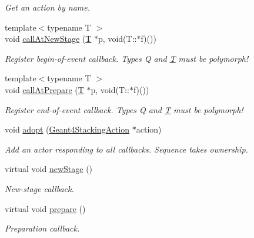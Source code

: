 \begin{DoxyCompactItemize}
\begin{DoxyCompactList}\small\item\em Get an action by name. \item\end{DoxyCompactList}\item 
{\footnotesize template$<$typename T $>$ }\\void \hyperlink{class_d_d4hep_1_1_simulation_1_1_geant4_stacking_action_sequence_a653b407655119e1d390d1297da1100c2}{callAtNewStage} (\hyperlink{class_t}{T} $\ast$p, void(T::$\ast$f)())
\begin{DoxyCompactList}\small\item\em Register begin-\/of-\/event callback. Types Q and \hyperlink{class_t}{T} must be polymorph! \item\end{DoxyCompactList}\item 
{\footnotesize template$<$typename T $>$ }\\void \hyperlink{class_d_d4hep_1_1_simulation_1_1_geant4_stacking_action_sequence_ab8f7094741075bb59ba07ef0c33d1c6c}{callAtPrepare} (\hyperlink{class_t}{T} $\ast$p, void(T::$\ast$f)())
\begin{DoxyCompactList}\small\item\em Register end-\/of-\/event callback. Types Q and \hyperlink{class_t}{T} must be polymorph! \item\end{DoxyCompactList}\item 
void \hyperlink{class_d_d4hep_1_1_simulation_1_1_geant4_stacking_action_sequence_a19b6f7d514d79b40c490226a361d55b4}{adopt} (\hyperlink{class_d_d4hep_1_1_simulation_1_1_geant4_stacking_action}{Geant4StackingAction} $\ast$action)
\begin{DoxyCompactList}\small\item\em Add an actor responding to all callbacks. Sequence takes ownership. \item\end{DoxyCompactList}\item 
virtual void \hyperlink{class_d_d4hep_1_1_simulation_1_1_geant4_stacking_action_sequence_a8077fe558cebbeeef5af0114abab6a55}{newStage} ()
\begin{DoxyCompactList}\small\item\em New-\/stage callback. \item\end{DoxyCompactList}\item 
virtual void \hyperlink{class_d_d4hep_1_1_simulation_1_1_geant4_stacking_action_sequence_a77ab67508d46a2af265090b04d5a41cb}{prepare} ()
\begin{DoxyCompactList}\small\item\em Preparation callback. \item\end{DoxyCompactList}\end{DoxyCompactItemize}
